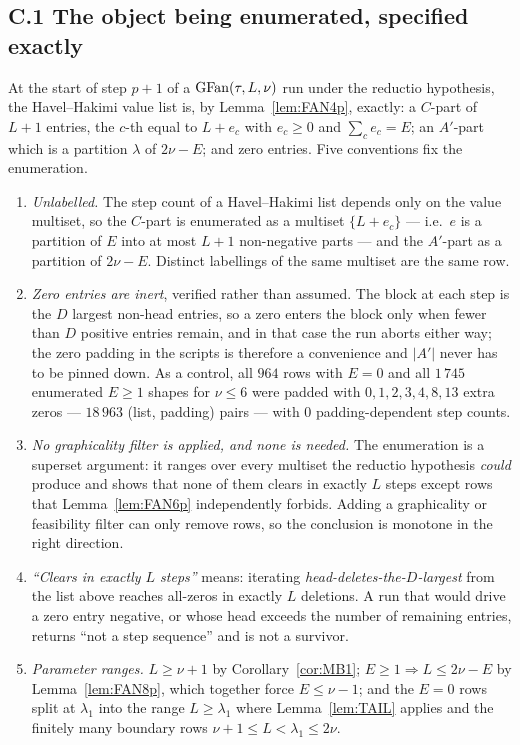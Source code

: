 \subsection*{C.1 The object being enumerated, specified exactly}

At the start of step $p+1$ of a $\mathrm{GFan}(\tau,L,\nu)$ run under the reductio hypothesis, the
Havel--Hakimi value list is, by Lemma~\ref{lem:FAN4p}, exactly: a $C$-part of $L+1$ entries,
the $c$-th equal to $L + e_c$ with $e_c \ge 0$ and $\sum_c e_c = E$; an $A'$-part which is a
partition $\lambda$ of $2\nu - E$; and zero entries. Five conventions fix the enumeration.

\begin{enumerate}
\item \emph{Unlabelled.} The step count of a Havel--Hakimi list depends only on the value
multiset, so the $C$-part is enumerated as a multiset $\{L+e_c\}$ --- i.e.\ $e$ is a
partition of $E$ into at most $L+1$ non-negative parts --- and the $A'$-part as a partition
of $2\nu-E$. Distinct labellings of the same multiset are the same row.

\item \emph{Zero entries are inert}, verified rather than assumed. The block at each step is
the $D$ largest non-head entries, so a zero enters the block only when fewer than $D$
positive entries remain, and in that case the run aborts either way; the zero padding in the
scripts is therefore a convenience and $|A'|$ never has to be pinned down. As a control, all
$964$ rows with $E = 0$ and all $1\,745$ enumerated $E \ge 1$ shapes for $\nu \le 6$ were
padded with $0,1,2,3,4,8,13$ extra zeros --- $18\,963$ (list, padding) pairs --- with $0$
padding-dependent step counts.

\item \emph{No graphicality filter is applied, and none is needed.} The enumeration is a
superset argument: it ranges over every multiset the reductio hypothesis \emph{could}
produce and shows that none of them clears in exactly $L$ steps except rows that
Lemma~\ref{lem:FAN6p} independently forbids. Adding a graphicality or feasibility filter can
only remove rows, so the conclusion is monotone in the right direction.

\item \emph{``Clears in exactly $L$ steps''} means: iterating
\emph{head-deletes-the-$D$-largest} from the list above reaches all-zeros in exactly $L$
deletions. A run that would drive a zero entry negative, or whose head exceeds the number of
remaining entries, returns ``not a step sequence'' and is not a survivor.

\item \emph{Parameter ranges.} $L \ge \nu+1$ by Corollary~\ref{cor:MB1};
$E \ge 1 \Rightarrow L \le 2\nu-E$ by Lemma~\ref{lem:FAN8p}, which together force
$E \le \nu-1$; and the $E = 0$ rows split at $\lambda_1$ into the range $L \ge \lambda_1$
where Lemma~\ref{lem:TAIL} applies and the finitely many boundary rows
$\nu+1 \le L < \lambda_1 \le 2\nu$.
\end{enumerate}

